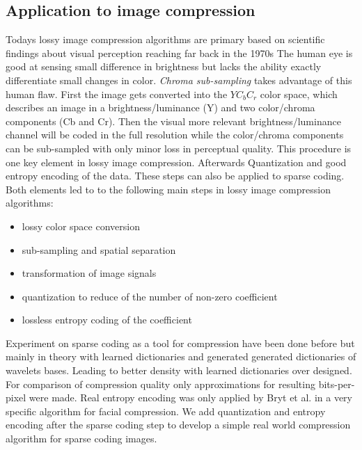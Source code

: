 \subsection{Application to image compression}
\label{sec:compression}
Todays lossy image compression algorithms are primary based on scientific
findings about visual perception reaching far back in the 1970s\cite{?}
The human eye is good at sensing small difference in brightness but lacks the
ability exactly differentiate small changes in color. \emph{Chroma sub-sampling}
takes advantage of this human flaw. First the image gets converted into the
$YC_bC_r$ color space, which describes an image in a brightness/luminance (Y)
and two color/chroma components (Cb and Cr). Then the visual more relevant
brightness/luminance channel will be coded in the full resolution while the
color/chroma components can be sub-sampled with only minor loss in perceptual
quality. This procedure
is one key element in lossy image compression. 
Afterwards 
Quantization and good entropy encoding of the data.
These steps can also be applied to sparse coding. Both elements
led to to the following main steps in lossy image compression algorithms:
\begin{itemize}
 \item lossy color space conversion
 \item sub-sampling and spatial separation
 \item transformation of image signals
 \item quantization to reduce of the number of non-zero coefficient 
 \item lossless entropy coding of the coefficient 
\end{itemize}

Experiment on sparse coding as a tool for compression have been done
before\cite{Lewicki1999,Murray2006} but mainly in theory with learned
dictionaries and generated generated dictionaries of wavelets bases. Leading to
better density with learned dictionaries over designed. For comparison of
compression quality only approximations for resulting bits-per-pixel were
made. Real entropy encoding was only applied by Bryt et al.\cite{Bryt2008} in
a very specific algorithm for facial compression. We add quantization and
entropy encoding after the sparse coding step to develop a simple real world
compression algorithm for sparse coding images.

